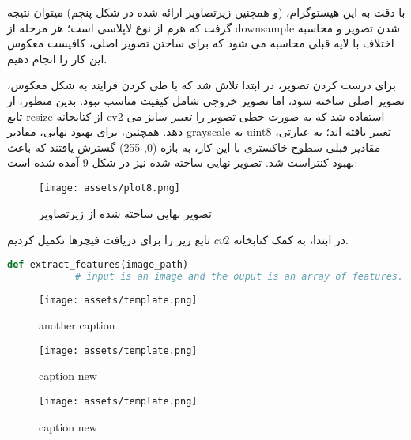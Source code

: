 \documentclass[a4paper,12pt]{article}
\begin{document}
با دقت به این هیستوگرام، (و همچنین زیرتصاویر ارائه شده در شکل پنجم) میتوان نتیجه گرفت که هرم از نوع لاپلاسی است؛ هر مرحله از downsample شدن تصویر و محاسبه اختلاف با لایه قبلی محاسبه می شود که برای ساختن تصویر اصلی، کافیست معکوس این کار را انجام دهیم.


\pagebreak

برای درست کردن تصویر، در ابتدا تلاش شد که با طی کردن فرایند به شکل معکوس، تصویر اصلی ساخته شود، اما تصویر خروجی شامل کیفیت مناسب نبود. بدین منظور، از تابع resize از کتابخانه cv2 استفاده شد که به صورت خطی تصویر را تغییر سایز می دهد. همچنین، برای بهبود نهایی، مقادیر grayscale به uint8 تغییر یافته اند؛ به عبارتی، مقادیر قبلی سطوح خاکستری با این کار، به بازه (0, 255) گسترش یافتند که باعث بهبود کنتراست شد.
تصویر نهایی ساخته شده نیز در شکل 9 آمده شده است:

\begin{figure}[h]
	\centering
	\texttt{[image: assets/plot8.png]}
	\caption{\textcolor{CustomAccent}{تصویر نهایی ساخته شده از زیرتصاویر}}
\end{figure}











	\pagebreak
	
	در ابتدا، به کمک کتابخانه 
	$cv2$
	تابع زیر را برای دریافت فیچرها تکمیل کردیم. 
	
	\begin{latin}
		\begin{lstlisting}[language=Python, caption={extract feature function}]
			def extract_features(image_path)
			# input is an image and the ouput is an array of features.
		\end{lstlisting}
	\end{latin}
	
	


	\begin{figure}[ht]
		\centering
		\begin{minipage}[t]{0.32\textwidth}
			\centering
			\texttt{[image: assets/template.png]}
			\caption{\textcolor{CustomAccent}{another caption}}
		\end{minipage}
		\hfill
		\begin{minipage}[t]{0.32\textwidth}
			\centering
			\texttt{[image: assets/template.png]}
			\caption{\textcolor{CustomAccent}{caption new}}
		\end{minipage}
		\vspace{1em}
		\hfill
		\begin{minipage}[t]{0.32\textwidth}
			\centering
			\texttt{[image: assets/template.png]}
			\caption{\textcolor{CustomAccent}{caption new}}
		\end{minipage}
		\vspace{1em}
	\end{figure}
	
\end{document}
